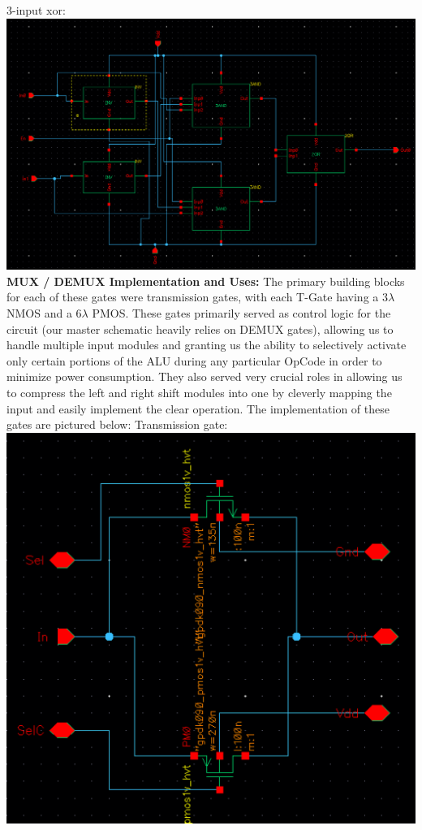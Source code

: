 \documentclass[12pt]{article}
\begin{document}
  	3-input xor:\\
 	 \includegraphics[scale=0.3]{xor.png} \\
	\newline \newline
	\textbf{MUX / DEMUX Implementation and Uses:}
	\newline \newline
	The primary building blocks for each of these gates were transmission gates, with each 
	T-Gate having a 3$\lambda$ NMOS and a 6$\lambda$ PMOS. These gates primarily served
	as control logic for the circuit (our master schematic heavily relies on DEMUX gates), 
	allowing us to handle multiple input modules and granting us the ability to selectively 
	activate only certain portions of the ALU during any particular OpCode
	in order to minimize power consumption. They also served very crucial roles in allowing us to
	compress the left and right shift modules into one by cleverly mapping the input and easily 
	implement the clear operation. The implementation of these gates are pictured below:
	\newline \newline
 	Transmission gate:\\
 	 \includegraphics[scale=0.4]{tgate.png} \\
\end{document}
